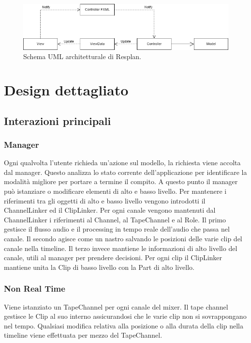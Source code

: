 \documentclass[a4paper,12pt]{report}
\begin{document}
\begin{figure}[h]
\centering{}
\includegraphics[width=\textwidth]{img/arch.png}
\caption{Schema UML architetturale di Resplan.}
\end{figure}

\section{Design dettagliato}

\subsection{Interazioni principali}
\subsubsection{Manager}
Ogni qualvolta l’utente richieda un’azione sul modello, la richiesta viene accolta dal manager. Questo analizza lo stato corrente dell’applicazione per identificare la modalità migliore per portare a termine il compito. A questo punto il manager può istanziare o modificare elementi di alto e basso livello.
Per mantenere i riferimenti tra gli oggetti di alto e basso livello vengono introdotti il ChannelLinker ed il ClipLinker. 
Per ogni canale vengono mantenuti dal ChannelLinker i riferimenti al Channel, al TapeChannel e al Role.
Il primo gestisce il flusso audio e il processing in tempo reale dell’audio che passa nel canale. Il secondo agisce come un nastro salvando le posizioni delle varie clip del canale nella timeline. Il terzo invece mantiene le informazioni di alto livello del canale, utili al manager per prendere decisioni.
Per ogni clip il ClipLinker mantiene unita la Clip di basso livello con la Part di alto livello.

\subsubsection{Non Real Time}
Viene istanziato un TapeChannel per ogni canale del mixer. Il tape channel gestisce le Clip al suo interno assicurandosi che le varie clip non si sovrappongano nel tempo. Qualsiasi modifica relativa alla posizione o alla durata della clip nella timeline viene effettuata per mezzo del TapeChannel.
\end{document}
